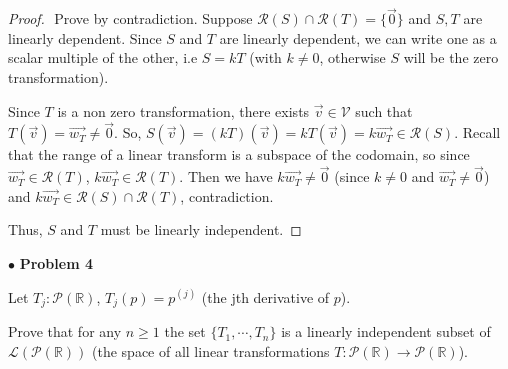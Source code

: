 \documentclass{article}
\begin{document}
\begin{proof}
$ $\newline
Prove by contradiction. Suppose $\mathcal{R}(S) \cap \mathcal{R}(T) = \{ \vec{0} \}$ and $S,T$ are linearly dependent. Since $S$ and $T$ are linearly dependent, we can write one as a scalar multiple of the other, i.e $S=kT$ (with $k \ne 0$, otherwise $S$ will be the zero transformation).

Since $T$ is a non zero transformation, there exists $\vec{v} \in \mathcal{V}$ such that $T(\vec{v})=\vec{w_T} \ne \vec{0}$. So, $S(\vec{v}) = (kT)(\vec{v}) = kT(\vec{v}) = k\vec{w_T} \in \mathcal{R}(S)$. Recall that the range of a linear transform is a subspace of the codomain, so since $\vec{w_T} \in \mathcal{R}(T)$,  $k \vec{w_T} \in \mathcal{R}(T)$. Then we have $k \vec{w_T} \ne \vec{0}$ (since $k \ne 0$ and $\vec{w_T} \ne \vec{0}$) and $k \vec{w_T} \in \mathcal{R}(S) \cap \mathcal{R}(T)$, contradiction.

Thus, $S$ and $T$ must be linearly independent. 
\end{proof}

\newpage
$ \bullet$ \textbf{Problem 4}
\medskip

\begin{itshape}
Let $T_j: \mathcal{P}(\mathbb{R})$, $T_j(p)=p^{(j)}$ (the jth derivative of $p$).

Prove that for any $n \ge 1$ the set $\{T_1, \cdots , T_n \}$ is a linearly independent subset of $\mathcal{L}(\mathcal{P}(\mathbb{R}))$ (the space of all linear transformations $T: \mathcal{P}(\mathbb{R}) \to \mathcal{P}(\mathbb{R})$). 
\end{itshape}
\medskip
\end{document}
